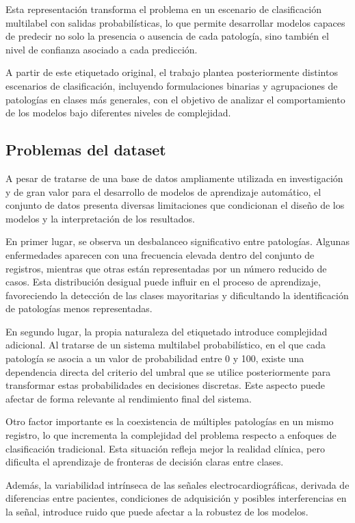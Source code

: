 \documentclass[12pt,a4paper,twoside]{book}
\begin{document}
Esta representación transforma el problema en un escenario de clasificación multilabel con salidas probabilísticas, lo que permite desarrollar modelos capaces de predecir no solo la presencia o ausencia de cada patología, sino también el nivel de confianza asociado a cada predicción.

A partir de este etiquetado original, el trabajo plantea posteriormente distintos escenarios de clasificación, incluyendo formulaciones binarias y agrupaciones de patologías en clases más generales, con el objetivo de analizar el comportamiento de los modelos bajo diferentes niveles de complejidad.

\subsection{Problemas del dataset}

A pesar de tratarse de una base de datos ampliamente utilizada en investigación y de gran valor para el desarrollo de modelos de aprendizaje automático, el conjunto de datos presenta diversas limitaciones que condicionan el diseño de los modelos y la interpretación de los resultados.

En primer lugar, se observa un desbalanceo significativo entre patologías. 
Algunas enfermedades aparecen con una frecuencia elevada dentro del conjunto de registros, mientras que otras están representadas por un número reducido de casos. 
Esta distribución desigual puede influir en el proceso de aprendizaje, favoreciendo la detección de las clases mayoritarias y dificultando la identificación de patologías menos representadas.

En segundo lugar, la propia naturaleza del etiquetado introduce complejidad adicional. 
Al tratarse de un sistema multilabel probabilístico, en el que cada patología se asocia a un valor de probabilidad entre 0 y 100, existe una dependencia directa del criterio del umbral que se utilice posteriormente para transformar estas probabilidades en decisiones discretas. 
Este aspecto puede afectar de forma relevante al rendimiento final del sistema.

Otro factor importante es la coexistencia de múltiples patologías en un mismo registro, lo que incrementa la complejidad del problema respecto a enfoques de clasificación tradicional. 
Esta situación refleja mejor la realidad clínica, pero dificulta el aprendizaje de fronteras de decisión claras entre clases.

Además, la variabilidad intrínseca de las señales electrocardiográficas, derivada de diferencias entre pacientes, condiciones de adquisición y posibles interferencias en la señal, introduce ruido que puede afectar a la robustez de los modelos.
\end{document}
